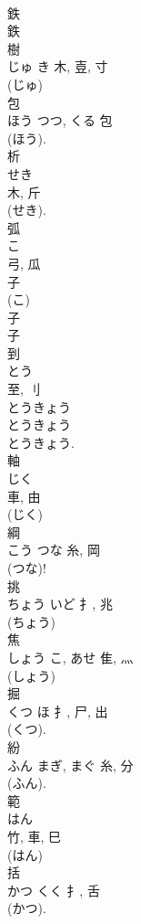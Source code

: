 \documentclass[8pt]{extreport}
\begin{document}
\begin{CJK}{UTF8}{min}
\\	鉄 
\\	鉄 
\\	樹	
\\	じゅ	き	木, 壴, 寸	
\\	(じゅ) 
\\	包	
\\	ほう	つつ, くる	包	
\\	(ほう). 
\\	析	
\\	せき	
\\	木, 斤	
\\	(せき). 
\\	弧	
\\	こ	
\\	弓, 瓜	
\\	子
\\	(こ) 
\\	子 
\\	子 
\\	到	
\\	とう	
\\	至, 刂	
\\	とうきょう 
\\	とうきょう 
\\	とうきょう.	
\\	軸	
\\	じく	
\\	車, 由	
\\	(じく) 
\\	綱	
\\	こう	つな	糸, 岡	
\\	(つな)! 
\\	挑	
\\	ちょう	いど	扌, 兆	
\\	(ちょう) 
\\	焦	
\\	しょう	こ, あせ	隹, 灬	
\\	(しょう) 
\\	掘	
\\	くつ	ほ	扌, 尸, 出	
\\	(くつ). 
\\	紛	
\\	ふん	まぎ, まぐ	糸, 分	
\\	(ふん).	
\\	範	
\\	はん	
\\	竹, 車, 巳	
\\	(はん) 
\\	括	
\\	かつ	くく	扌, 舌	
\\	(かつ). 

\end{CJK}
\end{document}
